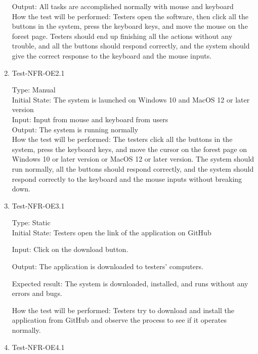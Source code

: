 \documentclass[12pt, titlepage]{article}
\begin{document}
\begin{enumerate}
Output: All tasks are accomplished normally with mouse and keyboard\\

How the test will be performed: Testers open the software, then click all the buttons in the system, press the keyboard keys, and move the mouse on the forest page. Testers should end up finishing all the actions without any trouble, and all the buttons should respond correctly, and the system should give the correct response to the keyboard and the mouse inputs. 

\item{Test-NFR-OE2.1\\}

Type: Manual\\

Initial State: The system is launched on Windows 10 and MacOS 12 or later version\\

Input:  Input from mouse and keyboard from users\\

Output: The system is running normally\\

How the test will be performed: The testers click all the buttons in the system, press the keyboard keys, and move the cursor on the forest page on Windows 10 or later version or MacOS 12 or later version. The system should run normally, all the buttons should respond correctly, and the system should respond correctly to the keyboard and the mouse inputs without breaking down.

\item{Test-NFR-OE3.1\\}

Type: Static\\

Initial State: Testers open the link of the application on GitHub

Input: Click on the download button.

Output: The application is downloaded to testers' computers.

Expected result: The system is downloaded, installed, and runs without any errors and bugs.

How the test will be performed: Testers try to download and install the application from GitHub and observe the process to see if it operates normally.

\item{Test-NFR-OE4.1\\}


\end{enumerate}
\end{document}
